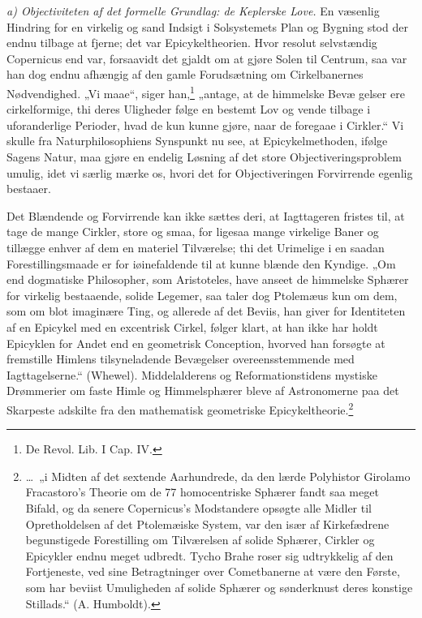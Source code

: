 \documentclass[12pt,a4paper]{book}
\newcommand{\runin}[1]{\emph{#1}\hspace{0.4em}}
\begin{document}
\runin{a) Objectiviteten af det formelle Grundlag: de Keplerske Love.}
En væsenlig Hindring for en virkelig og sand Indsigt i Solsystemets Plan
og Bygning stod der endnu tilbage at fjerne; det var Epicykeltheorien.
Hvor resolut selvstændig Copernicus end var, forsaavidt det gjaldt om at
gjøre Solen til Centrum, saa var han dog endnu afhængig af den gamle
Forudsætning om Cirkelbanernes Nødvendighed. „Vi maae“, siger
han,\footnote{%
De Revol. Lib. I Cap. IV.} „antage, at de himmelske Bevæ\-%
gelser ere cirkelformige, thi deres Uligheder følge en bestemt Lov og
vende tilbage i uforanderlige Perioder, hvad de kun kunne gjøre, naar de
foregaae i Cirkler.“ Vi skulle fra Naturphilosophiens Synspunkt nu see,
at Epicykelmethoden, ifølge Sagens Natur, maa gjøre en endelig Løsning
af det store Objectiveringsproblem umulig, idet vi særlig mærke os,
hvori det for Objectiveringen Forvirrende egenlig bestaaer.

Det Blændende og Forvirrende kan ikke sættes deri, at Iagttageren
fristes til, at tage de mange Cirkler, store og smaa, for ligesaa mange
virkelige Baner og tillægge enhver af dem en materiel Tilværelse; thi
det Urimelige i en saadan Forestillingsmaade er for iøinefaldende til at
kunne blænde den Kyndige. „Om end dogmatiske Philosopher, som
Aristoteles, have anseet de himmelske Sphærer for virkelig bestaaende,
solide Legemer, saa taler dog Ptolemæus kun om dem, som om blot
imaginære Ting, og allerede af det Beviis, han giver for Identiteten af
en Epicykel med en excentrisk Cirkel, følger klart, at han ikke har
holdt Epicyklen for Andet end en geometrisk Conception, hvorved han
forsøgte at fremstille Himlens tilsyneladende Bevægelser
overeensstemmende med Iagttagelserne.“ (Whewel). Middelalderens og
Reformationstidens mystiske Drømmerier om faste Himle og Himmelsphærer
bleve af Astronomerne paa det Skarpeste adskilte fra den mathematisk
geometriske Epicykeltheorie.\footnote{%
\dots\ „i Midten af det sextende Aarhundrede, da den lærde Polyhistor
Girolamo Fracastoro's Theorie om de 77 homocentriske Sphærer fandt saa
meget Bifald, og da senere Copernicus's Modstandere opsøgte alle Midler
til Opretholdelsen af det Ptolemæiske System, var den især af
Kirkefædrene begunstigede Forestilling om Tilværelsen af solide Sphærer,
Cirkler og Epicykler endnu meget udbredt. Tycho Brahe roser sig
udtrykkelig af den Fortjeneste, ved sine Betragtninger over
Cometbanerne at være den Første, som har beviist Umuligheden af solide
Sphærer og sønderknust deres konstige Stillads.“ (A. Humboldt).}
\end{document}
